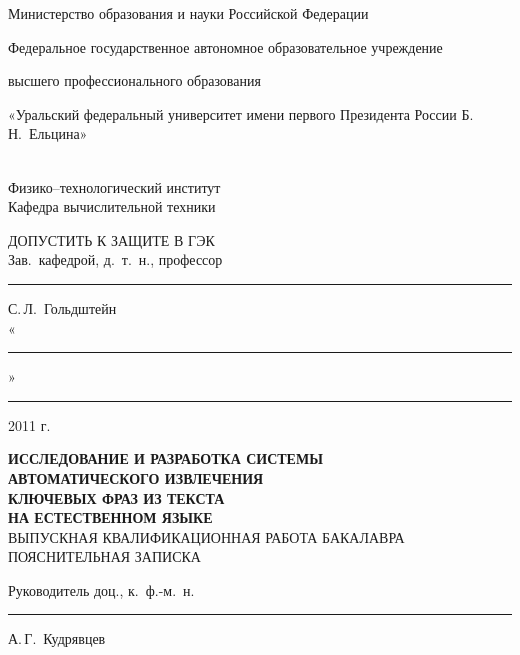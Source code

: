 \newpage
\thispagestyle{empty}

\begin{centering}

\addtolength{\parskip}{-0.25em}
{
\small
Министерство образования и науки Российской Федерации

Федеральное государственное автономное
образовательное учреждение

высшего профессионального образования

«Уральский федеральный университет имени первого
Президента России Б.\,Н.~Ельцина»
} \\
\vspace{0.3em}
Физико--технологический институт \\
\vspace{0.3em}
Кафедра вычислительной техники
\addtolength{\parskip}{0.25em}

\vspace{2em}

\begin{minipage}{.9\textwidth}
\begin{flushright}
  {\large{ДОПУСТИТЬ К ЗАЩИТЕ В ГЭК}\vspace{1ex}} \\
  Зав.\ кафедрой, д.\ т.\ н., профессор
  \vspace{0.5ex} \\
  \rule{30mm}{1pt}\hspace{3mm}С.\,Л.~Гольдштейн
  \vspace{0.5ex} \\
  «\rule{10mm}{1pt}» \rule{40mm}{1pt} 2011 г.
\end{flushright}
\end{minipage}

\vspace{2em}

{
  \large
  \textbf{ИССЛЕДОВАНИЕ И РАЗРАБОТКА СИСТЕМЫ} \\
  \textbf{АВТОМАТИЧЕСКОГО ИЗВЛЕЧЕНИЯ} \\
  \textbf{КЛЮЧЕВЫХ ФРАЗ ИЗ ТЕКСТА} \\
  \textbf{НА ЕСТЕСТВЕННОМ ЯЗЫКЕ} \\
  \vspace{1em}
  ВЫПУСКНАЯ КВАЛИФИКАЦИОННАЯ РАБОТА БАКАЛАВРА \\
}
\vspace{1em}
ПОЯСНИТЕЛЬНАЯ ЗАПИСКА

\vspace{2em}

\begin{minipage}{0.45\textwidth}
  \begin{flushleft}
    Руководитель доц., к.\ ф.-м.\ н.
  \end{flushleft}
\end{minipage}
\begin{minipage}{0.5\textwidth}
  \begin{flushleft}
    \rule{3cm}{1pt} А.\,Г.~Кудрявцев
  \end{flushleft}
\end{minipage}


\end{centering}
